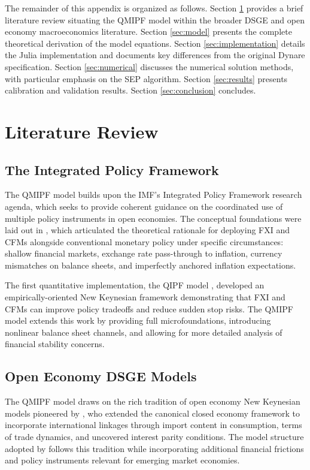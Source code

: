 \documentclass[12pt]{article}
\begin{document}
The remainder of this appendix is organized as follows. Section \ref{sec:literature} provides a brief literature review situating the QMIPF model within the broader DSGE and open economy macroeconomics literature. Section \ref{sec:model} presents the complete theoretical derivation of the model equations. Section \ref{sec:implementation} details the Julia implementation and documents key differences from the original Dynare specification. Section \ref{sec:numerical} discusses the numerical solution methods, with particular emphasis on the SEP algorithm. Section \ref{sec:results} presents calibration and validation results. Section \ref{sec:conclusion} concludes.

\section{Literature Review}\label{sec:literature}

\subsection{The Integrated Policy Framework}

The QMIPF model builds upon the IMF's Integrated Policy Framework research agenda, which seeks to provide coherent guidance on the coordinated use of multiple policy instruments in open economies. The conceptual foundations were laid out in \citet{adrian2020conceptual}, which articulated the theoretical rationale for deploying FXI and CFMs alongside conventional monetary policy under specific circumstances: shallow financial markets, exchange rate pass-through to inflation, currency mismatches on balance sheets, and imperfectly anchored inflation expectations.

The first quantitative implementation, the QIPF model \citep{adrian2020quantitative}, developed an empirically-oriented New Keynesian framework demonstrating that FXI and CFMs can improve policy tradeoffs and reduce sudden stop risks. The QMIPF model \citep{adrian2021quantitative} extends this work by providing full microfoundations, introducing nonlinear balance sheet channels, and allowing for more detailed analysis of financial stability concerns.

\subsection{Open Economy DSGE Models}

The QMIPF model draws on the rich tradition of open economy New Keynesian models pioneered by \citet{gali2005monetary}, who extended the canonical closed economy framework to incorporate international linkages through import content in consumption, terms of trade dynamics, and uncovered interest parity conditions. The model structure adopted by \citet{adrian2021quantitative} follows this tradition while incorporating additional financial frictions and policy instruments relevant for emerging market economies.
\end{document}
